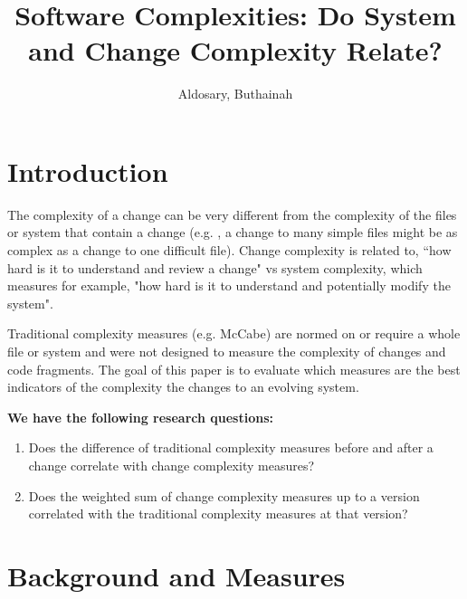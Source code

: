 \documentclass[8pt,twocolumn,a4paper]{article}
\newcommand*{\eg}{e.g. }
\begin{document}
\author{Aldosary, Buthainah}

\title{Software Complexities: Do System and Change Complexity Relate?}




\maketitle
\section{Introduction}

The complexity of a change can be very different from the complexity of the
files or system that contain a change (\eg, a change to many simple files
might be as complex as a change to one difficult file). Change complexity is
related to, ``how hard is it to understand and review a change" vs system
complexity, which measures for example, "how hard is it to understand and
potentially modify the system". 

Traditional complexity measures (\eg McCabe) are normed on or require a whole
file or system and were not designed to measure the complexity of changes and
code fragments. The goal of this paper is to evaluate which measures are the
best indicators of the complexity the changes to an evolving system. 


\textbf{We have the following research questions:}

\begin{enumerate}

\item Does the difference of traditional complexity measures before and after a change correlate with change complexity measures?

\item Does the weighted sum of change complexity measures up to a version correlated with the traditional complexity measures at that version? 

\end{enumerate}

\section{Background and Measures}
\end{document}
